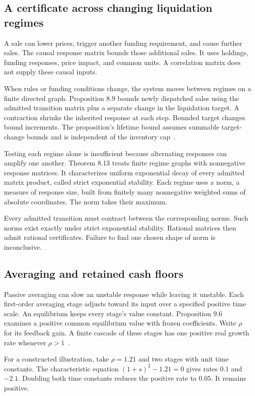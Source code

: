 \documentclass{momentum}
\begin{document}
\subsection{A certificate across changing liquidation regimes}

A sale can lower prices, trigger another funding requirement, and cause further sales. The causal response matrix bounds those additional sales. It uses holdings, funding responses, price impact, and common units. A correlation matrix does not supply these causal inputs.

When rules or funding conditions change, the system moves between regimes on a finite directed graph. Proposition 8.9 bounds newly dispatched sales using the admitted transition matrix plus a separate change in the liquidation target. A contraction shrinks the inherited response at each step. Bounded target changes bound increments. The proposition's lifetime bound assumes summable target-change bounds and is independent of the inventory cap~\cite[\S8.2]{ccp}.

Testing each regime alone is insufficient because alternating responses can amplify one another. Theorem 8.13 treats finite regime graphs with nonnegative response matrices. It characterizes uniform exponential decay of every admitted matrix product, called strict exponential stability. Each regime uses a norm, a measure of response size, built from finitely many nonnegative weighted sums of absolute coordinates. The norm takes their maximum.

Every admitted transition must contract between the corresponding norms. Such norms exist exactly under strict exponential stability. Rational matrices then admit rational certificates. Failure to find one chosen shape of norm is inconclusive.

\subsection{Averaging and retained cash floors}

Passive averaging can slow an unstable response while leaving it unstable. Each first-order averaging stage adjusts toward its input over a specified positive time scale. An equilibrium keeps every stage's value constant. Proposition 9.6 examines a positive common equilibrium value with frozen coefficients. Write $\rho$ for its feedback gain. A finite cascade of these stages has one positive real growth rate whenever $\rho>1$~\cite[\S9.1]{ccp}.

For a constructed illustration, take $\rho=1.21$ and two stages with unit time constants. The characteristic equation $(1+s)^2-1.21=0$ gives rates $0.1$ and $-2.1$. Doubling both time constants reduces the positive rate to $0.05$. It remains positive.
\end{document}
